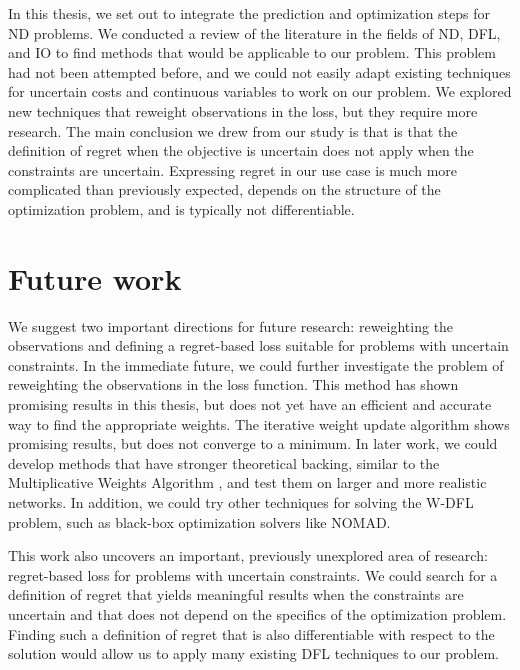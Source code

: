 In this thesis, we set out to integrate the prediction and optimization steps for ND problems. We conducted a review of the literature in the fields of ND, DFL, and IO to find methods that would be applicable to our problem. This problem had not been attempted before, and we could not easily adapt existing techniques for uncertain costs and continuous variables to work on our problem. We explored new techniques that reweight observations in the loss, but they require more research. The main conclusion we drew from our study is that is that the definition of regret when the objective is uncertain does not apply when the constraints are uncertain. Expressing regret in our use case is much more complicated than previously expected, depends on the structure of the optimization problem, and is typically not differentiable.

\section{Future work} \label{sec:conclusion:future-work}

We suggest two important directions for future research: reweighting the observations and defining a regret-based loss suitable for problems with uncertain constraints. In the immediate future, we could further investigate the problem of reweighting the observations in the loss function. This method has shown promising results in this thesis, but does not yet have an efficient and accurate way to find the appropriate weights. The iterative weight update algorithm shows promising results, but does not converge to a minimum. In later work, we could develop methods that have stronger theoretical backing, similar to the Multiplicative Weights Algorithm \citep{multiweights}, and test them on larger and more realistic networks. In addition, we could try other techniques for solving the W-DFL problem, such as black-box optimization solvers like NOMAD.

This work also uncovers an important, previously unexplored area of research: regret-based loss for problems with uncertain constraints. We could search for a definition of regret that yields meaningful results when the constraints are uncertain and that does not depend on the specifics of the optimization problem. Finding such a definition of regret that is also differentiable with respect to the solution would allow us to apply many existing DFL techniques to our problem.